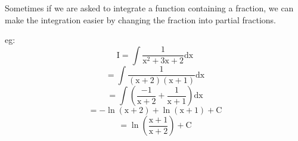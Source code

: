 Sometimes if we are asked to integrate a function containing a fraction,
we can make the integration easier by changing the fraction into partial 
fractions.
\par
eg: \[ \mathrm{I} = \int \frac {1}{\mathrm{x}^2 + 3 \mathrm{x} + 2} \mathrm{dx} \]
\[ = \int \frac {1}{ \mathrm{(x + 2)(x + 1)}}\mathrm{dx} \]
\[ = \int \left ( \frac {-1}{\mathrm{x}+2} + \frac {1}{\mathrm{x} + 1} \right ) \mathrm{dx} \]
\[ = - \ln ( \mathrm{x} + 2) + \ln ( \mathrm{x} + 1) + \mathrm{C} \]
\[ = \ln \left ( \frac{\mathrm{x} + 1}{\mathrm{x}+2} \right ) + \mathrm{C} \]